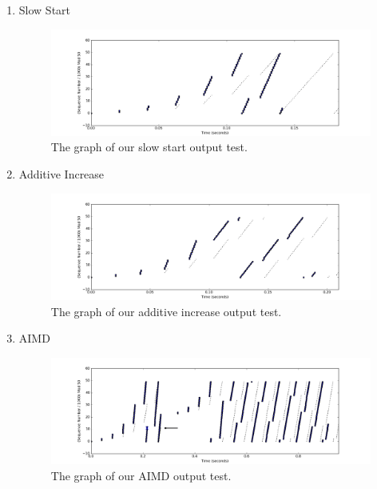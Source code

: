 \documentclass[11pt]{article}
\begin{document}
\begin{enumerate}
  \item Slow Start
  
\begin{figure}[H]
\caption{The graph of our slow start output test.}
	\label{figure1}
  	\centering
  	\includegraphics{figure1}
\end{figure}


  \item Additive Increase
  
  \begin{figure}[H]
\caption{The graph of our additive increase output test.}
	\label{figure2}
  	\centering
  	\includegraphics{figure2}
\end{figure}


  \item AIMD

\begin{figure}[H]
\caption{The graph of our AIMD output test.}
	\label{figure3}
  	\centering
  	\includegraphics{figure3}
\end{figure}


\end{enumerate}
\end{document}
